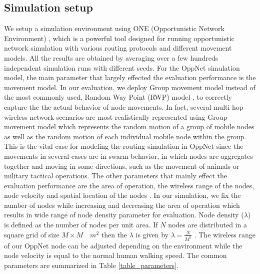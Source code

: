 \subsection{Simulation setup}
We setup a simulation environment using ONE (Opportunistic Network Environment) \cite{Keranen2009b}, which is a powerful tool designed for running opportunistic network simulation with various routing protocols and different movement models.
All the results are obtained by averaging over a few hundreds independent simulation runs with different seeds.
For the OppNet simulation model, the main parameter that largely effected the evaluation performance is the movement model.
In our evaluation, we deploy Group movement model instead of the most commonly used, Random Way Point (RWP) model \cite{Batabyal2012}, to correctly capture the the actual behavior of node movements.
In fact, several multi-hop wireless network scenarios are most realistically represented using Group movement model \cite{Blakely2004} which represents the random motion of a group of mobile nodes as well as the random motion of each individual mobile node within the group.
This is the vital case for modeling the routing simulation in OppNet since the movements in several cases are in swarm behavior, in which nodes are aggregates together and moving in some directions, such as the movement of animals or military tactical operations.
The other parameters that mainly effect the evaluation performance are the area of operation, the wireless range of the nodes, node velocity and spatial location of the nodes \cite{Batabyal2012}. 
In our simulation, we fix the number of nodes while increasing and decreasing the area of operation which results in wide range of node density parameter for evaluation.
Node density ($\lambda$) is defined as the number of nodes per unit area. 
If $N$ nodes are distributed in a square grid of size $M \times M \quad{ m }^{ 2 }$ then the $\lambda$ is given by $\lambda =\frac { N }{ { M }^{ 2 } } $ . 
The wireless range of our OppNet node can be adjusted depending on the environment while the node velocity is equal to the normal human walking speed.
The common parameters are summarized in Table \ref{table_parameters}.

